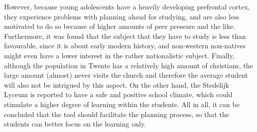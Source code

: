 However, because young adolescents have a heavily developing prefrontal cortex, they experience problems with planning ahead for studying, and are also less motivated to do so because of higher amounts of peer pressure and the like. Furthermore, it was found that the subject that they have to study is less than favourable, since it is about early modern history, and non-western non-natives might even have a lower interest in the rather nationalistic subject. Finally, although the population in Twente has a relatively high amount of christians, the large amount (almost) never visits the church and therefore the average student will also not be intrigued by this aspect. On the other hand, the Stedelijk Lyceum is reported to have a safe and positive school climate, which could stimulate a higher degree of learning within the students. All in all, it can be concluded that the tool should facilitate the planning process, so that the students can better focus on the learning only.
